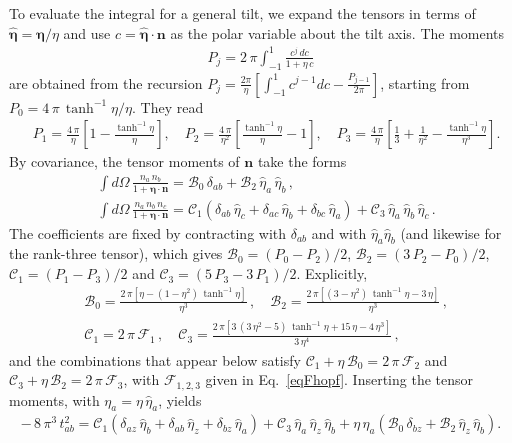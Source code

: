\documentclass[aps,prb,onecolumn,nofootinbib,citeautoscript,10pt]{revtex4-2}
\newcommand{\bs}[1]{\boldsymbol{#1}}
\def \nn{\nonumber \\}
\begin{document}
To evaluate the integral for a general tilt, we expand the tensors in terms of $\hat{\bs\eta}=\bs\eta/\eta$ and use $c=\hat{\bs\eta}\cdot\bs n$ as the polar variable about the tilt axis. The moments
\begin{align}
P_j = 2\,\pi \int_{-1}^{1} \frac{c^j\,dc}{1+\eta\,c}
\end{align}
are obtained from the recursion $P_j=\frac{2\pi}{\eta}\left[\int_{-1}^1 c^{j-1}dc-\frac{P_{j-1}}{2\pi}\right]$, starting from $P_0=4\,\pi\,\tanh^{-1}\eta/\eta$. They read
\begin{align}
& P_1 = \frac{4\,\pi}{\eta} \left[ 1 - \frac{\tanh^{-1}\eta}{\eta} \right], \quad
P_2 = \frac{4\,\pi}{\eta^2} \left[ \frac{\tanh^{-1}\eta}{\eta} - 1 \right], \quad
P_3 = \frac{4\,\pi}{\eta} \left[ \frac13 + \frac{1}{\eta^2} - \frac{\tanh^{-1}\eta}{\eta^3} \right].
\end{align}
By covariance, the tensor moments of $\bs n$ take the forms
\begin{align}
& \int d\Omega\, \frac{n_a\,n_b}{1+\bs\eta\cdot\bs n} = \mathscr B_0\,\delta_{ab} + \mathscr B_2\,\hat\eta_a\,\hat\eta_b \,, \nn &
\int d\Omega\, \frac{n_a\,n_b\,n_c}{1+\bs\eta\cdot\bs n} = \mathscr C_1 \left( \delta_{ab}\,\hat\eta_c + \delta_{ac}\,\hat\eta_b + \delta_{bc}\,\hat\eta_a \right) + \mathscr C_3\,\hat\eta_a\,\hat\eta_b\,\hat\eta_c \,.
\end{align}
The coefficients are fixed by contracting with $\delta_{ab}$ and with $\hat\eta_a\hat\eta_b$ (and likewise for the rank-three tensor), which gives $\mathscr B_0=(P_0-P_2)/2$, $\mathscr B_2=(3\,P_2-P_0)/2$, $\mathscr C_1=(P_1-P_3)/2$ and $\mathscr C_3=(5\,P_3-3\,P_1)/2$. Explicitly,
\begin{align}
& \mathscr B_0 = \frac{2\,\pi \left[ \eta - (1-\eta^2)\,\tanh^{-1}\eta \right]}{\eta^3} \,, \quad
\mathscr B_2 = \frac{2\,\pi \left[ (3-\eta^2)\,\tanh^{-1}\eta - 3\,\eta \right]}{\eta^3} \,, \nn &
\mathscr C_1 = 2\,\pi\,\mathcal F_1 \,, \quad
\mathscr C_3 = \frac{2\,\pi \left[ 3\,(3\,\eta^2-5)\,\tanh^{-1}\eta + 15\,\eta - 4\,\eta^3 \right]}{3\,\eta^4}\,,
\end{align}
and the combinations that appear below satisfy $\mathscr C_1+\eta\,\mathscr B_0=2\,\pi\,\mathcal F_2$ and $\mathscr C_3+\eta\,\mathscr B_2=2\,\pi\,\mathcal F_3$, with $\mathcal F_{1,2,3}$ given in Eq.~\eqref{eqFhopf}. Inserting the tensor moments, with $\eta_a=\eta\,\hat\eta_a$, yields
\begin{align}
-\,8\,\pi^3\,t^2_{ab} = \mathscr C_1 \left( \delta_{az}\,\hat\eta_b + \delta_{ab}\,\hat\eta_z + \delta_{bz}\,\hat\eta_a \right) + \mathscr C_3\,\hat\eta_a\,\hat\eta_z\,\hat\eta_b + \eta\,\hat\eta_a \left( \mathscr B_0\,\delta_{bz} + \mathscr B_2\,\hat\eta_z\,\hat\eta_b \right) .
\end{align}
\end{document}
